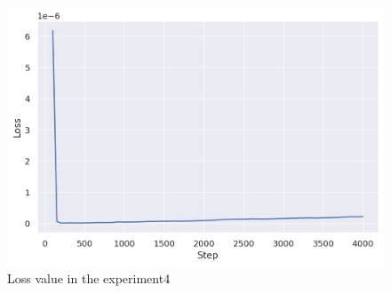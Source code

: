 \begin{figure}[h]
  \centering
  \includegraphics[keepaspectratio, scale=0.33]{images/00_02_rename_9.png}
  \caption{Loss value in the experiment4}
  \label{Fig:loss4}
\end{figure}

